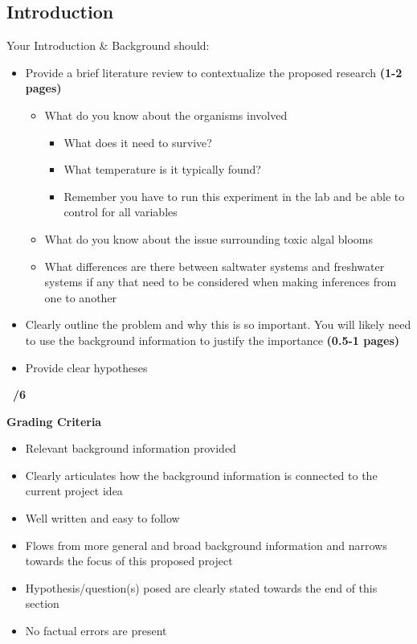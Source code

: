 \documentclass[
]{book}
\providecommand{\tightlist}{%
  \setlength{\itemsep}{0pt}\setlength{\parskip}{0pt}}
\begin{document}
\hypertarget{introduction}{%
\subsection*{Introduction}\label{introduction}}

Your Introduction \& Background should:

\begin{itemize}
\tightlist
\item
  Provide a brief literature review to contextualize the proposed research \textbf{(1-2 pages)}

  \begin{itemize}
  \tightlist
  \item
    What do you know about the organisms involved

    \begin{itemize}
    \tightlist
    \item
      What does it need to survive?
    \item
      What temperature is it typically found?
    \item
      Remember you have to run this experiment in the lab and be able to control for all variables
    \end{itemize}
  \item
    What do you know about the issue surrounding toxic algal blooms
  \item
    What differences are there between saltwater systems and freshwater systems if any that need to be considered when making inferences from one to another
  \end{itemize}
\item
  Clearly outline the problem and why this is so important. You will likely need to use the background information to justify the importance \textbf{(0.5-1 pages)}
\item
  Provide clear hypotheses
\end{itemize}

\textbf{~/6}

\textbf{Grading Criteria}

\begin{itemize}
\tightlist
\item
  Relevant background information provided
\item
  Clearly articulates how the background information is connected to the current project idea
\item
  Well written and easy to follow
\item
  Flows from more general and broad background information and narrows towards the focus of this proposed project
\item
  Hypothesis/question(s) posed are clearly stated towards the end of this section
\item
  No factual errors are present
\end{itemize}
\end{document}

